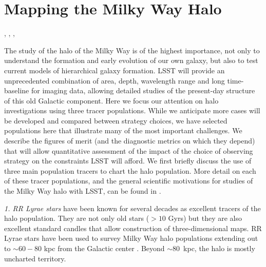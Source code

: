 %
%
%

\section{Mapping the Milky Way Halo}
\def\secname{MW_Halo}\label{sec:\secname}

, , , 

The study of the halo of the Milky Way is of the highest importance,
not only to understand the formation and early evolution of our own
galaxy, but also to test current models of hierarchical galaxy
formation. LSST will provide an unprecedented combination of area,
depth, wavelength range and long time-baseline for imaging data,
allowing detailed studies of the present-day structure of this old
Galactic component.  Here we
focus our attention on halo investigations using three tracer
populations. While we anticipate more cases will be developed and
compared between strategy choices, we have selected populations here
that illustrate many of the most important challenges.
We describe the figures of merit (and the
diagnostic metrics on which they depend) that will allow quantitative
assessment of the impact of the choice of observing strategy on the
constraints LSST will afford.
We first briefly discuss the use of three main population tracers to
chart the halo population. More detail on each of these tracer
populations, and the general scientific motivations for studies of the
Milky Way halo with LSST, can be found in \citet{2009arXiv0912.0201L}.

{\it 1. RR Lyrae stars} have been known for several decades as
excellent tracers of the halo population. They are not only old stars
($>10$ Gyrs) but they are also excellent standard candles that allow
construction of three-dimensional maps. RR Lyrae stars have been used
to survey Milky Way halo populations extending out to
$\sim 60-80$ kpc from the Galactic center \citep[][among
  others]{drake13a,drake13b,zinn14,torrealba15}. Beyond $\sim 80$~kpc,
the halo is mostly uncharted territory.

